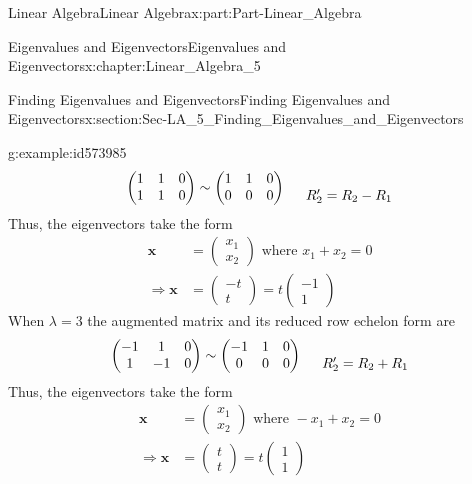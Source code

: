 \documentclass[oneside,10pt,]{book}
\numberwithin{equation}{section}
\newcommand{\amp}{&}
\begin{document}
\begin{partptx}{Linear Algebra}{}{Linear Algebra}{}{}{x:part:Part-Linear_Algebra}
\begin{chapterptx}{Eigenvalues and Eigenvectors}{}{Eigenvalues and Eigenvectors}{}{}{x:chapter:Linear_Algebra_5}
\begin{sectionptx}{Finding Eigenvalues and Eigenvectors}{}{Finding Eigenvalues and Eigenvectors}{}{}{x:section:Sec-LA_5_Finding_Eigenvalues_and_Eigenvectors}
\begin{example}{}{g:example:id573985}
\begin{equation*}
\begin{pmatrix} 1 \amp 1 \amp 0 \\ 1 \amp 1 \amp 0 \end{pmatrix} \sim \begin{pmatrix} 1 \amp 1 \amp 0 \\ 0 \amp 0 \amp 0 \end{pmatrix}  \begin{matrix} \\ \hspace{5mm} R_2'=R_2-R_1 \end{matrix}
\end{equation*}
Thus, the eigenvectors take the form%
\begin{align*}
\mathbf{x} \amp =\begin{pmatrix}x_1 \\ x_2\end{pmatrix} \textrm{ where } x_1+x_2=0\\
\Rightarrow \mathbf{x} \amp =\begin{pmatrix} -t \\ t \end{pmatrix}=t\begin{pmatrix} -1 \\ 1 \end{pmatrix} 
\end{align*}
When \(\lambda=3\) the augmented matrix and its reduced row echelon form are%
\begin{equation*}
\begin{pmatrix} -1 \amp 1 \amp 0 \\ 1 \amp -1 \amp 0 \end{pmatrix} \sim \begin{pmatrix} -1 \amp 1 \amp 0 \\ 0 \amp 0 \amp 0 \end{pmatrix}  \begin{matrix} \\ \hspace{5mm} R_2'=R_2+R_1 \end{matrix}
\end{equation*}
Thus, the eigenvectors take the form%
\begin{align*}
\mathbf{x} \amp =\begin{pmatrix}x_1 \\ x_2\end{pmatrix} \textrm{ where } -x_1+x_2=0\\
\Rightarrow \mathbf{x} \amp =\begin{pmatrix} t \\ t \end{pmatrix}=t\begin{pmatrix} 1 \\ 1 \end{pmatrix} 

\end{align*}
\end{example}
\end{sectionptx}
\end{chapterptx}
\end{partptx}
\end{document}
